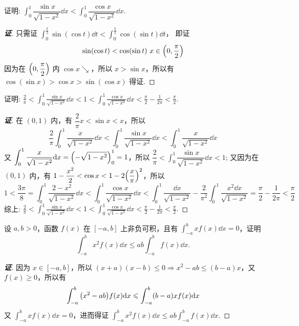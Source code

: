 \begin{example}
    证明: $\displaystyle\int_{0}^{1}\dfrac{\sin x}{\sqrt{1-x^2}}\dd x<\int_{0}^{1}\dfrac{\cos x}{\sqrt{1-x^2}}\dd x.$
\end{example}
\begin{proof}[{\songti \textbf{证}}]
    只需证 $\displaystyle\int_{0}^{\frac{\pi}{2}}\sin(\cos t)\dd t<\int_{0}^{\frac{\pi}{2}}\cos(\sin t)\dd t$，
    即证 $$\sin(\cos t)<\cos(\sin t)~  x\in\qty(0,\dfrac{\pi}{2})$$
    因为在 $\qty(0,\dfrac{\pi}{2})$ 内 $\cos x\searrow$，所以 $x>\sin x$，所以有
    $\cos(\sin x)>\cos x>\sin(\cos x)$
    得证.
\end{proof}
\begin{inference}
    证明: $\displaystyle \frac{2}{\pi} < \int_{0}^{1} \frac{\sin x}{\sqrt{1-x^{2}}} \dd  x<1<\int_{0}^{1} \frac{\cos x}{\sqrt{1-x^{2}}} \dd  x<\frac{\pi}{2}-\frac{1}{2 \pi}<\frac{\pi}{2}.$
\end{inference}
\begin{proof}[{\songti \textbf{证}}]
    在 $(0,1)$ 内，有 $\dfrac{2}{\pi}x<\sin x< x$，所以
    $$\dfrac{2}{\pi}\int_{0}^{1}\dfrac{x}{\sqrt{1-x^2}}\dd x<\int_{0}^{1}\dfrac{\sin x}{\sqrt{1-x^2}}\dd x<\int_{0}^{1}\dfrac{x}{\sqrt{1-x^2}}\dd x$$
    又 $\displaystyle\int_{0}^{1}\dfrac{x}{\sqrt{1-x^2}}\dd x=\qty(-\sqrt{1-x^2})_0^1=1$，所以 $\displaystyle \dfrac{2}{\pi}<\int_{0}^{1}\dfrac{\sin x}{\sqrt{1-x^2}}\dd x<1$;
    又因为在 $(0,1)$ 内，有 $1-\dfrac{x^2}{2}<\cos x<1-2\qty(\dfrac{x}{\pi})^2$，所以
    $$1<\dfrac{3\pi}{8}=\int_{0}^{1}\dfrac{2-x^2}{\sqrt{1-x^2}}\dd x<\int_{0}^{1}\dfrac{\cos x}{\sqrt{1-x^2}}\dd x<\int_{0}^{1}\dfrac{\dd x}{\sqrt{1-x^2}}-\dfrac{2}{\pi^2}\int_{0}^{1}\dfrac{x^2\dd x}{\sqrt{1-x^2}}=\dfrac{\pi}{2}-\dfrac{1}{2\pi}<\dfrac{\pi}{2}$$
    综上: $\displaystyle \frac{2}{\pi} < \int_{0}^{1} \frac{\sin x}{\sqrt{1-x^{2}}} \dd  x<1<\int_{0}^{1} \frac{\cos x}{\sqrt{1-x^{2}}} \dd  x<\frac{\pi}{2}-\frac{1}{2 \pi}<\frac{\pi}{2}.$
\end{proof}

\begin{example}
    设 $a,b>0$，函数 $f(x)$ 在 $[-a,b]$ 上非负可积，且有 $\displaystyle\int_{-a}^{b}xf(x)\dd x=0$，证明
    $$\int_{-a}^{b}x^2f(x)\dd x\leqslant ab\int_{-a}^{b}f(x)\dd x.$$
\end{example}
\begin{proof}[{\songti \textbf{证}}]
    因为 $x\in[-a,b]$，所以 $(x+a)(x-b)\leqslant 0\Rightarrow x^2-ab\leqslant (b-a)x$，又 $f(x)\geqslant 0$，所以有
    $$\int_{-a}^{b}\qty(x^2-ab)f(x)\dd x\leqslant \int_{-a}^{b}(b-a)xf(x)\dd x$$
    又 $\displaystyle\int_{-a}^{b}xf(x)\dd x=0$，进而得证 $\displaystyle\int_{-a}^{b}x^2f(x)\dd x\leqslant ab\int_{-a}^{b}f(x)\dd x.$
\end{proof}

